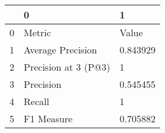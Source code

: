\begin{tabular}{lll}
\toprule
{} &                     0 &         1 \\
\midrule
0 &                Metric &     Value \\
1 &     Average Precision &  0.843929 \\
2 &  Precision at 3 (P@3) &         1 \\
3 &             Precision &  0.545455 \\
4 &                Recall &         1 \\
5 &            F1 Measure &  0.705882 \\
\bottomrule
\end{tabular}
